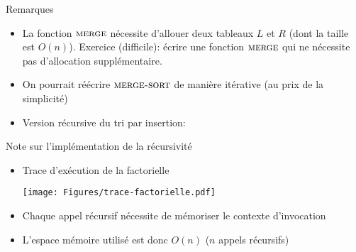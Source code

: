 \begin{frame}{Remarques}

\begin{itemize}
\item La fonction $\textnormal{\scshape merge}$ nécessite d'allouer deux tableaux $L$
  et $R$ (dont la taille est $O(n)$). Exercice (difficile): écrire une
  fonction $\textnormal{\scshape merge}$ qui ne nécessite pas d'allocation
  supplémentaire.
\item On pourrait réécrire $\textnormal{\scshape merge-sort}$ de manière itérative (au prix de la simplicité)
\item Version récursive du tri par insertion:
\begin{center}
\end{center}
\end{itemize}
\end{frame}

\begin{frame}{Note sur l'implémentation de la récursivité}
\begin{itemize}
\item Trace d'exécution de la factorielle
\centerline{\texttt{[image: Figures/trace-factorielle.pdf]}}
\item Chaque appel récursif nécessite de mémoriser le \alert{contexte d'invocation}
\item L'espace mémoire utilisé est donc $O(n)$ ($n$ appels récursifs)
\end{itemize}
\end{frame}

